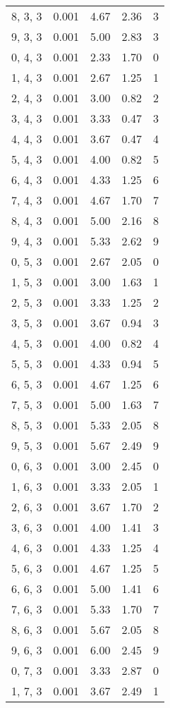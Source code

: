 \documentclass[12pt]{article}
\begin{document}
\begin{tabular}{c || c || c | c | c}
8, 3, 3 & 0.001 & 4.67 & 2.36 & 3 \\
9, 3, 3 & 0.001 & 5.00 & 2.83 & 3 \\
0, 4, 3 & 0.001 & 2.33 & 1.70 & 0 \\
1, 4, 3 & 0.001 & 2.67 & 1.25 & 1 \\
2, 4, 3 & 0.001 & 3.00 & 0.82 & 2 \\
3, 4, 3 & 0.001 & 3.33 & 0.47 & 3 \\
4, 4, 3 & 0.001 & 3.67 & 0.47 & 4 \\
5, 4, 3 & 0.001 & 4.00 & 0.82 & 5 \\
6, 4, 3 & 0.001 & 4.33 & 1.25 & 6 \\
7, 4, 3 & 0.001 & 4.67 & 1.70 & 7 \\
8, 4, 3 & 0.001 & 5.00 & 2.16 & 8 \\
9, 4, 3 & 0.001 & 5.33 & 2.62 & 9 \\
0, 5, 3 & 0.001 & 2.67 & 2.05 & 0 \\
1, 5, 3 & 0.001 & 3.00 & 1.63 & 1 \\
2, 5, 3 & 0.001 & 3.33 & 1.25 & 2 \\
3, 5, 3 & 0.001 & 3.67 & 0.94 & 3 \\
4, 5, 3 & 0.001 & 4.00 & 0.82 & 4 \\
5, 5, 3 & 0.001 & 4.33 & 0.94 & 5 \\
6, 5, 3 & 0.001 & 4.67 & 1.25 & 6 \\
7, 5, 3 & 0.001 & 5.00 & 1.63 & 7 \\
8, 5, 3 & 0.001 & 5.33 & 2.05 & 8 \\
9, 5, 3 & 0.001 & 5.67 & 2.49 & 9 \\
0, 6, 3 & 0.001 & 3.00 & 2.45 & 0 \\
1, 6, 3 & 0.001 & 3.33 & 2.05 & 1 \\
2, 6, 3 & 0.001 & 3.67 & 1.70 & 2 \\
3, 6, 3 & 0.001 & 4.00 & 1.41 & 3 \\
4, 6, 3 & 0.001 & 4.33 & 1.25 & 4 \\
5, 6, 3 & 0.001 & 4.67 & 1.25 & 5 \\
6, 6, 3 & 0.001 & 5.00 & 1.41 & 6 \\
7, 6, 3 & 0.001 & 5.33 & 1.70 & 7 \\
8, 6, 3 & 0.001 & 5.67 & 2.05 & 8 \\
9, 6, 3 & 0.001 & 6.00 & 2.45 & 9 \\
0, 7, 3 & 0.001 & 3.33 & 2.87 & 0 \\
1, 7, 3 & 0.001 & 3.67 & 2.49 & 1 \\

\end{tabular}
\end{document}
